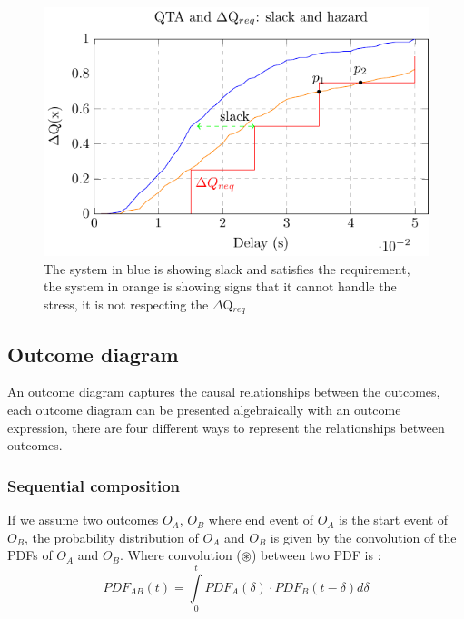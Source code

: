         \begin{figure}[H]
            \begin{center}
                \includegraphics[width=\textwidth]{tikz/cdf_qta_slack.pdf}
            \end{center}
            \caption{The system in blue is showing slack and satisfies the requirement, the system in orange is showing signs that it cannot handle the stress, it is not respecting the $\Delta$Q$_{req}$}
        \end{figure}

   
    \subsection{Outcome diagram}
        An outcome diagram captures the causal relationships between the outcomes, each outcome diagram can be presented algebraically with an outcome expression, there are four different ways to represent the relationships between outcomes.

    \subsubsection{Sequential composition}
        If we assume two outcomes $O_A$, $O_B$ where end event of $O_A$ is the start event of $O_B$, the probability distribution of $O_A$ and $O_B$ is given by the convolution of the PDFs of $O_A$ and $O_B$.
        Where convolution ($\circledast$) between two PDF is :
        \begin{equation}
            PDF_{AB}(t) =\int\limits_0^t PDF_A(\delta) \cdot PDF_B(t-\delta)d\delta 
            \label{eq:}
        \end{equation}

